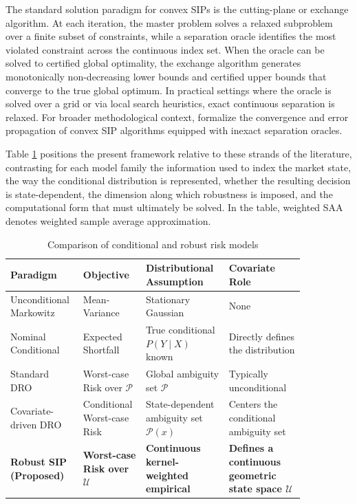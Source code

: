 \documentclass[smallcondensed]{svjour3}
\begin{document}
The standard solution paradigm for convex SIPs is the cutting-plane or exchange algorithm. At each iteration, the master problem solves a relaxed subproblem over a finite subset of constraints, while a separation oracle identifies the most violated constraint across the continuous index set. When the oracle can be solved to certified global optimality, the exchange algorithm generates monotonically non-decreasing lower bounds and certified upper bounds that converge to the true global optimum. In practical settings where the oracle is solved over a grid or via local search heuristics, exact continuous separation is relaxed. For broader methodological context, \cite{oustry2025convex} formalize the convergence and error propagation of convex SIP algorithms equipped with inexact separation oracles.


Table \ref{tab:lit_comparison} positions the present framework relative to these
strands of the literature, contrasting for each model family the information
used to index the market state, the way the conditional distribution is
represented, whether the resulting decision is state-dependent, the dimension
along which robustness is imposed, and the computational form that must
ultimately be solved. In the table, weighted SAA denotes weighted sample
average approximation.

\begin{table}[!htbp]
\centering
\caption{Comparison of conditional and robust risk models}
\label{tab:lit_comparison}
\begin{tabular}{>{\raggedright\arraybackslash}p{0.18\linewidth}>{\raggedright\arraybackslash}p{0.17\linewidth}>{\raggedright\arraybackslash}p{0.26\linewidth}>{\raggedright\arraybackslash}p{0.24\linewidth}}
\toprule
\textbf{Paradigm} & \textbf{Objective} & \textbf{Distributional Assumption} & \textbf{Covariate Role} \\
\midrule
Unconditional Markowitz & Mean-Variance & Stationary Gaussian & None \\
Nominal Conditional & Expected Shortfall & True conditional $P(Y \mid X)$ known & Directly defines the distribution \\
Standard DRO & Worst-case Risk over $\mathcal{P}$ & Global ambiguity set $\mathcal{P}$ & Typically unconditional \\
Covariate-driven DRO & Conditional Worst-case Risk & State-dependent ambiguity set $\mathcal{P}(x)$ & Centers the conditional ambiguity set \\
\textbf{Robust SIP (Proposed)} & \textbf{Worst-case Risk over $\mathcal{U}$} & \textbf{Continuous kernel-weighted empirical} & \textbf{Defines a continuous geometric state space $\mathcal{U}$} \\
\bottomrule
\end{tabular}
\end{table}
\end{document}
